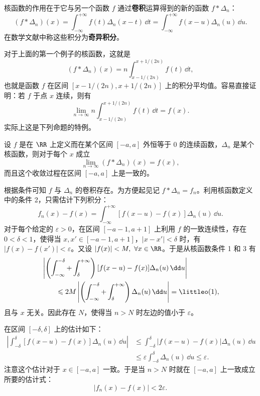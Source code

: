 核函数的作用在于它与另一个函数 $f$ 通过\textbf{卷积}运算得到的新的函数 $f*\Delta_n$：
\begin{equation}
  (f*\Delta_n)(x)=\int_{-\infty}^{+\infty}f(t)\Delta_n(x-t)\,\dd t
  =\int_{-\infty}^{+\infty}f(x-u)\Delta_n(u)\,\dd u.
\tag{16.15}
\label{eq:16.15}
\end{equation}
在数学文献中称这些积分为\textbf{奇异积分}。

对于上面的第一个例子的核函数，这就是
\[
  (f*\Delta_n)(x)=n\int_{x-1/(2n)}^{x+1/(2n)}f(t)\,\dd t,
\]
也就是函数 $f$ 在区间 $[x-1/(2n),x+1/(2n)]$ 上的积分平均值。容易直接证明：若 $f$ 于点 $x$ 连续，则有
\[
  \lim_{n\to\infty}n\int_{x-1/(2n)}^{x+1/(2n)}f(t)\,\dd t=f(x).
\]
实际上这是下列命题的特例。

\begin{xproposition}[16.3.3]
设 $f$ 是在 $\RR$ 上定义而在某个区间 $[-a,a]$ 外恒等于 0 的连续函数，$\Delta_n$ 是某个核函数，则对于每个 $x$ 成立
\[
  \lim_{n\to\infty}(f*\Delta_n)(x)=f(x),
\]
而且这个收敛过程在区间 $[-a,a]$ 上是一致的。
\end{xproposition}

\begin{xproof}
根据条件可知 $f$ 与 $\Delta_n$ 的卷积存在。为方便起见记 $f*\Delta_n=f_n$。利用核函数定义中的条件 2，只需估计下列积分：
\[
  f_n(x)-f(x)=\int_{-\infty}^{+\infty}[f(x-u)-f(x)]\Delta_n(u)\,\dd u.
\]
对于每个给定的 $\varepsilon>0$，在区间 $[-a-1,a+1]$ 上利用 $f$ 的一致连续性，存在 $0<\delta<1$，使得当 $x,x'\in[-a-1,a+1]$，$|x-x'|<\delta$ 时，有 $|f(x)-f(x')|<\varepsilon$。又设 $|f(x)|<M,\ \forall x\in\RR$。于是从核函数条件 1 和 3 有
\[
\begin{aligned}
&\left|\left(\int_{-\infty}^{-\delta}+\int_\delta^{+\infty}\right)
 [f(x-u)-f(x)]\Delta_n(u)\,\dd u\right|\\
&\qquad\leqslant2M\left|\left(\int_{-\infty}^{-\delta}+\int_\delta^{+\infty}\right)
 \Delta_n(u)\,\dd u\right|=\littleo(1),
\end{aligned}
\]
且与 $x$ 无关。因此存在 $N$，使得当 $n>N$ 时左边的值小于 $\varepsilon$。

在区间 $[-\delta,\delta]$ 上的估计如下：
\[
\begin{aligned}
  \left|\int_{-\delta}^{\delta}[f(x-u)-f(x)]\Delta_n(u)\,\dd u\right|
  &\leqslant\int_{-\delta}^{\delta}|f(x-u)-f(x)|\Delta_n(u)\,\dd u\\
  &\leqslant\varepsilon\int_{-\delta}^{\delta}\Delta_n(u)\,\dd u
  \leqslant\varepsilon.
\end{aligned}
\]
注意这个估计对于 $x\in[-a,a]$ 一致。于是当 $n>N$ 时就在 $[-a,a]$ 上一致成立所要的估计式：
\[
  |f_n(x)-f(x)|<2\varepsilon.
\]
\end{xproof}


